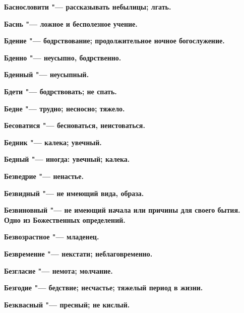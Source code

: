 \begin{mymulticols}{2}
\bfseries Баснословити\normalfont{} "--- рассказывать небылицы; лгать. 




\bfseries Баснь\normalfont{} "--- ложное и бесполезное учение. 




\bfseries Бдение\normalfont{} "--- бодрствование; продолжительное ночное богослужение. 




\bfseries Бденно\normalfont{} "--- неусыпно, бодрственно. 




\bfseries Бденный\normalfont{} "--- неусыпный. 




\bfseries Бдети\normalfont{} "--- бодрствовать; не спать. 




\bfseries Бедне\normalfont{} "--- трудно; несносно; тяжело. 




\bfseries Бесоватися\normalfont{} "--- бесноваться, неистоваться. 




\bfseries Бедник\normalfont{} "--- калека; увечный. 




\bfseries Бедный\normalfont{} "--- иногда: увечный; калека. 




\bfseries Безведрие\normalfont{} "--- ненастье. 




\bfseries Безвидный\normalfont{} "--- не имеющий вида, образа. 




\bfseries Безвиновный\normalfont{} "--- не имеющий начала или причины для своего бытия. Одно из Божественных определений. 




\bfseries Безвозрастное\normalfont{} "--- младенец. 




\bfseries Безвременне\normalfont{} "--- некстати; неблаговременно. 




\bfseries Безгласие\normalfont{} "--- немота; молчание. 




\bfseries Безгодие\normalfont{} "--- бедствие; несчастье; тяжелый период в жизни. 




\bfseries Безквасный\normalfont{} "--- пресный; не кислый. 





\end{mymulticols}

